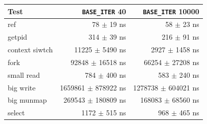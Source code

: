 \begin{tabular}{@{}lrr@{}}
\toprule
Test & \texttt{BASE\_ITER} 40 & \texttt{BASE\_ITER} 10000 \\
\midrule
ref & 78 $\pm$ 19 ns & 58 $\pm$ 23 ns \\
getpid & 314 $\pm$ 39 ns & 216 $\pm$ 91 ns \\
context siwtch & 11225 $\pm$ 5490 ns & 2927 $\pm$ 1458 ns \\
fork & 92848 $\pm$ 16518 ns & 66254 $\pm$ 27208 ns \\
small read & 784 $\pm$ 400 ns & 583 $\pm$ 240 ns \\
big write & 1659861 $\pm$ 878922 ns & 1278738 $\pm$ 604021 ns \\
big munmap & 269543 $\pm$ 180809 ns & 168083 $\pm$ 68560 ns \\
select & 1172 $\pm$ 515 ns & 968 $\pm$ 465 ns \\
\bottomrule
\end{tabular}
